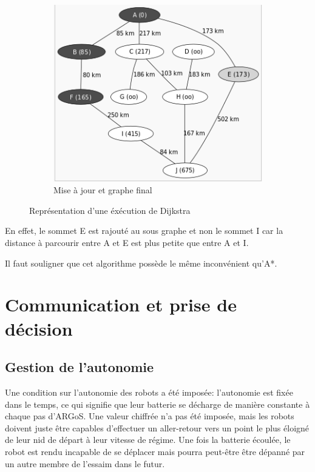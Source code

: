 \documentclass[a4paper,11pt]{report}
\begin{document}
\begin{figure}[h!]
        \begin{subfigure}[h!]{0.4\textwidth}
                \includegraphics[width=\textwidth]{dijk3.png}
                \caption{Mise à jour et graphe final}
        \end{subfigure}
        \caption{Représentation d'une éxécution de Dijkstra\label{fig:dijkstra}\cite{wikiDijkstra}}
\end{figure}


En effet, le sommet E est rajouté au sous graphe et non le sommet I car la distance à parcourir entre A et E est plus petite que entre A et I.

Il faut souligner que cet algorithme possède le même inconvénient qu'A*. 

\chapter{Communication et prise de décision}

\section{Gestion de l'autonomie}
Une condition sur l'autonomie des robots a été imposée: l'autonomie est fixée dans le temps, ce qui signifie que leur batterie se décharge de manière constante à chaque pas d'ARGoS. Une valeur chiffrée n'a pas été imposée, mais les robots doivent juste être capables d'effectuer un aller-retour vers un point le plus éloigné de leur nid de départ à leur vitesse de régime. Une fois la batterie écoulée, le robot est rendu incapable de se déplacer mais pourra peut-être être dépanné par un autre membre de l'essaim dans le futur.
\end{document}
